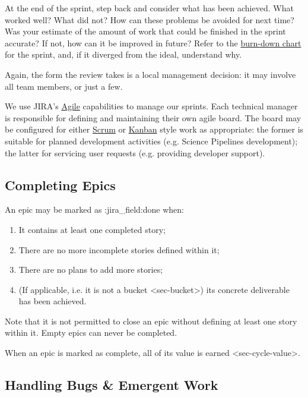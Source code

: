 \begin{enumerate}
  At the end of the sprint, step back and consider what has been
  achieved. What worked well? What did not? How can these problems be
  avoided for next time? Was your estimate of the amount of work that
  could be finished in the sprint accurate? If not, how can it be
  improved in future? Refer to the
  \href{https://en.wikipedia.org/wiki/Burn_down_chart}{burn-down chart}
  for the sprint, and, if it diverged from the ideal, understand why.

  Again, the form the review takes is a local management decision: it
  may involve all team members, or just a few.
\end{enumerate}

We use JIRA's
\href{https://www.atlassian.com/software/jira/agile}{Agile} capabilities
to manage our sprints. Each technical manager is responsible for
defining and maintaining their own agile board. The board may be
configured for either
\href{https://en.wikipedia.org/wiki/Scrum_(software_development)}{Scrum}
or \href{https://en.wikipedia.org/wiki/Kanban_(development)}{Kanban}
style work as appropriate: the former is suitable for planned
development activities (e.g. Science Pipelines development); the latter
for servicing user requests (e.g. providing developer support).

\subsection{Completing Epics}\label{completing-epics}

An epic may be marked as :jira\_field:done when:

\begin{enumerate}
\item
  It contains at least one completed story;
\item
  There are no more incomplete stories defined within it;
\item
  There are no plans to add more stories;
\item
  (If applicable, i.e. it is not a
  bucket \textless{}sec-bucket\textgreater{}) its concrete deliverable
  has been achieved.
\end{enumerate}

Note that it is not permitted to close an epic without defining at least
one story within it. Empty epics can never be completed.

When an epic is marked as complete, all of its value is earned
\textless{}sec-cycle-value\textgreater{}.

\subsection{Handling Bugs \& Emergent
Work}\label{handling-bugs-emergent-work}

